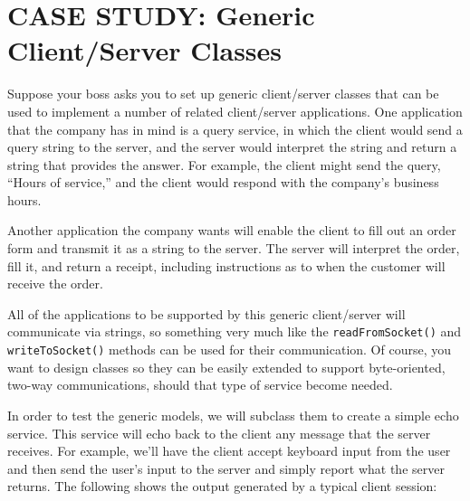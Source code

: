 
\section{CASE STUDY: Generic Client/Server Classes}
\label{casestudy-generic-client-server-classes}
\label{sec-clientserver}\label{pg-sec-clientserver}
\noindent Suppose your boss asks you to set up generic client/server classes
that can be used to implement a number of related client/server
applications.  One application that the company has in mind is a query
service, in which the client would send a query string to the server,
and the server would interpret the string and return a string that
provides the answer.  For example, the client might send the query,
``Hours of service,'' and the client would respond with the company's
business hours.

Another application the company wants will enable the client to fill out an
order form and transmit it as a string to the server.  The server will
interpret the order, fill it, and return a receipt, including
instructions as to when the customer will receive the order.

All of the applications to be supported by this generic client/server
will communicate via strings, so something very much like the
{\tt readFromSocket()} and {\tt writeToSocket()} methods can be used for
their communication.  Of course, you want to design classes so they
can be easily extended to support byte-oriented, two-way
communications, should that type of service become needed.

In order to test the generic models, we will subclass them to create a
simple echo service.  This service will echo back to the client any
message that the server receives.  For example, we'll have the client
accept keyboard input from the user and then send the user's input to
the server and simply report what the server returns.   The following
shows the output generated by a typical client session:

